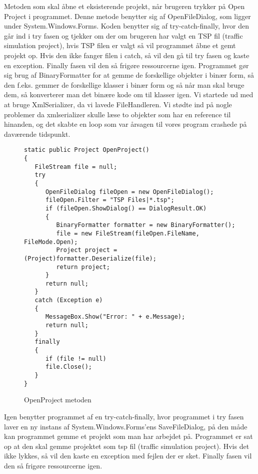 Metoden som skal åbne et eksisterende projekt, når brugeren trykker på Open Project i programmet. Denne metode benytter sig af OpenFileDialog, som ligger under System.Windows.Forms. Koden benytter sig af try-catch-finally, hvor den går ind i try fasen og tjekker om der om brugeren har valgt en TSP fil (traffic simulation project), hvis TSP filen er valgt så vil programmet åbne et gemt projekt op. Hvis den ikke fanger filen i catch, så vil den gå til try fasen og kaste en exception. Finally fasen vil den så frigøre ressourcerne igen. Programmet gør sig brug af BinaryFormatter for at gemme de forskellige objekter i binær form, så den f.eks. gemmer de forskellige klasser i binær form og så når man skal bruge dem, så konverterer man det binære kode om til klasser igen. Vi startede ud med at bruge XmlSerializer, da vi lavede FileHandleren. Vi stødte ind på nogle problemer da xmlserializer skulle læse to objekter som har en reference til hinanden, og det skabte en loop som var årsagen til vores program crashede på daværende tidspunkt. 

\begin{figure}[H]
\begin{lstlisting}
static public Project OpenProject()
{
   FileStream file = null;
   try
   {
      OpenFileDialog fileOpen = new OpenFileDialog();
      fileOpen.Filter = "TSP Files|*.tsp";
      if (fileOpen.ShowDialog() == DialogResult.OK)
      {
         BinaryFormatter formatter = new BinaryFormatter();
         file = new FileStream(fileOpen.FileName, FileMode.Open);
         Project project = (Project)formatter.Deserialize(file);
         return project;
      }
      return null;
   }
   catch (Exception e)
   {
      MessageBox.Show("Error: " + e.Message);
      return null;
   }
   finally
   {
      if (file != null)
      file.Close();
   }
}
\end{lstlisting}
\caption{OpenProject metoden}\label{OpenProjectCode}
\end{figure}

\vspace{5mm}

Igen benytter programmet af en try-catch-finally, hvor programmet i try fasen laver en ny instans af System.Windows.Forms'ens SaveFileDialog, på den måde kan programmet gemme et projekt som man har arbejdet på. Programmet er sat op at den skal gemme projektet som tsp fil (traffic simulation project). Hvis det ikke lykkes, så vil den kaste en exception med fejlen der er sket. Finally fasen vil den så frigøre ressourcerne igen.

